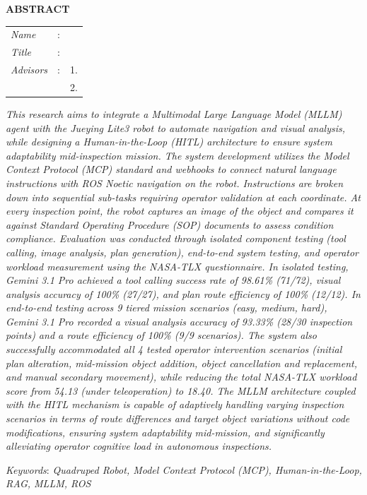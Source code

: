 \begin{center}
  \large\textbf{ABSTRACT}
\end{center}


\vspace{2ex}

\begingroup
\setlength{\tabcolsep}{0pt}

\noindent
\begin{tabularx}{\textwidth}{l >{\centering}m{3em} X}
  \emph{Name}     & : & \name{}         \\

  \emph{Title}    & : & \engtatitle{}   \\

  \emph{Advisors} & : & 1. \advisor{}   \\
                  &   & 2. \coadvisor{} \\
\end{tabularx}
\endgroup

\emph{This research aims to integrate a Multimodal Large Language Model (MLLM) agent with the Jueying Lite3 robot to automate navigation and visual analysis, while designing a Human-in-the-Loop (HITL) architecture to ensure system adaptability mid-inspection mission. The system development utilizes the Model Context Protocol (MCP) standard and webhooks to connect natural language instructions with ROS Noetic navigation on the robot. Instructions are broken down into sequential sub-tasks requiring operator validation at each coordinate. At every inspection point, the robot captures an image of the object and compares it against Standard Operating Procedure (SOP) documents to assess condition compliance. Evaluation was conducted through isolated component testing (tool calling, image analysis, plan generation), end-to-end system testing, and operator workload measurement using the NASA-TLX questionnaire. In isolated testing, Gemini 3.1 Pro achieved a tool calling success rate of 98.61\% (71/72), visual analysis accuracy of 100\% (27/27), and plan route efficiency of 100\% (12/12). In end-to-end testing across 9 tiered mission scenarios (easy, medium, hard), Gemini 3.1 Pro recorded a visual analysis accuracy of 93.33\% (28/30 inspection points) and a route efficiency of 100\% (9/9 scenarios). The system also successfully accommodated all 4 tested operator intervention scenarios (initial plan alteration, mid-mission object addition, object cancellation and replacement, and manual secondary movement), while reducing the total NASA-TLX workload score from 54.13 (under teleoperation) to 18.40. The MLLM architecture coupled with the HITL mechanism is capable of adaptively handling varying inspection scenarios in terms of route differences and target object variations without code modifications, ensuring system adaptability mid-mission, and significantly alleviating operator cognitive load in autonomous inspections.}


\emph{Keywords}: \emph{Quadruped Robot, Model Context Protocol (MCP), Human-in-the-Loop, RAG, MLLM, ROS}
